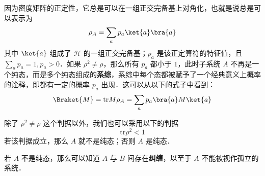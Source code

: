 因为密度矩阵的正定性，它总是可以在一组正交完备基上对角化，也就是说总是可以表示为
\begin{equation}
\rho_A=\sum_a p_a\ket{a}\bra{a}
\end{equation}
其中 $\ket{a}$ 组成了 $\mathcal{H}$ 的一组正交完备基；$p_a$ 是该正定算符的特征值，且 $\sum_a p_a=1,p_a>0$．如果 $\rho^2\neq \rho$，那么所有 $p_a$ 都小于 $1$，此时子系统 $A$ 不再是一个纯态，而是多个纯态组成的\textbf{系综}，系综中每个态都被赋予了一个经典意义上概率的诠释，即都有一定的概率 $p_a$ 出现．这可以从以下的式子中看到：
\begin{equation}
\Braket{M}=\text{tr} M\rho_A = \sum_a p_a \bra{a}M\ket{a}
\end{equation}


除了 $\rho^2\neq \rho$ 这个判据以外，我们也可以采用以下的判据
\begin{equation}
\text{tr} \rho^2 <1
\end{equation}
若该判据成立，那么 $A$ 就不是纯态；否则 $A$ 是纯态．

若 $A$ 不是纯态，那么可以知道 $A$ 与 $B$ 间存在\textbf{纠缠}，以至于 $A$ 不能被视作孤立的系统．